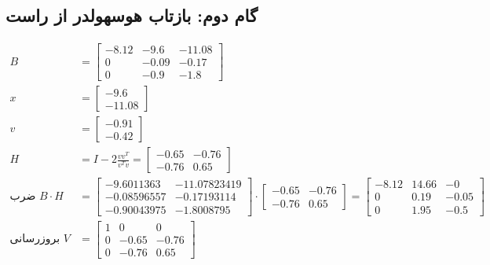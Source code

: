 \subsection*{گام دوم: بازتاب هوسهولدر از راست }
\begin{align*}
B &= \begin{bmatrix}
 -8.12 &  -9.6 &  -11.08 \\
  0 &  -0.09 &  -0.17 \\
  0 &  -0.9 &  -1.8
\end{bmatrix} \\
x &= \begin{bmatrix}
 -9.6 \\
 -11.08
\end{bmatrix} \\
v &= \begin{bmatrix}
-0.91 \\
-0.42
\end{bmatrix} \\
H &= I - 2 \frac{vv^T}{v^T v} = \begin{bmatrix}
-0.65 & -0.76 \\
-0.76 &  0.65
\end{bmatrix} \\
\text{ضرب } B \cdot H &= \begin{bmatrix}
 -9.6011363 & -11.07823419 \\
 -0.08596557 & -0.17193114 \\
 -0.90043975 & -1.8008795
\end{bmatrix} \cdot \begin{bmatrix}
-0.65 & -0.76 \\
-0.76 &  0.65
\end{bmatrix} = \begin{bmatrix}
-8.12 & 14.66 & -0 \\
 0 & 0.19 & -0.05 \\
 0 & 1.95 & -0.5
\end{bmatrix} \\
\text{بروزرسانی } V &= \begin{bmatrix}
 1 & 0 & 0 \\
 0 & -0.65 & -0.76 \\
 0 & -0.76 &  0.65
\end{bmatrix}
\end{align*}

